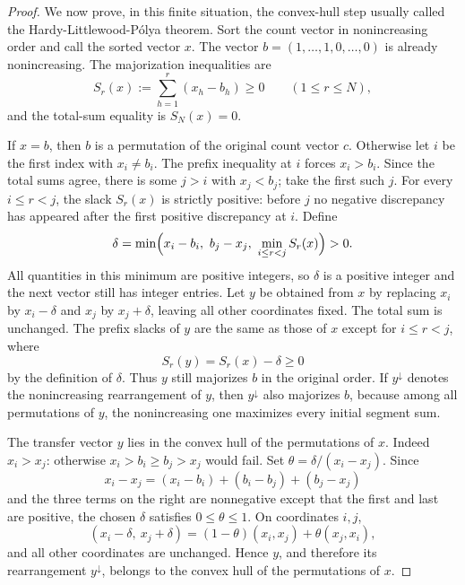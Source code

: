 \begin{proof}
We now prove, in this finite situation, the convex-hull step usually called
the Hardy-Littlewood-P\'olya theorem.  Sort the count vector in nonincreasing
order and call the sorted vector \(x\).  The vector \(b=(1,\ldots,1,0,\ldots,0)\)
is already nonincreasing.  The majorization inequalities are
\[
S_r(x):=\sum_{h=1}^r(x_h-b_h)\ge0\qquad(1\le r\le N),
\]
and the total-sum equality is \(S_N(x)=0\).

If \(x=b\), then \(b\) is a permutation of the original count vector \(c\).
Otherwise let \(i\) be the first index with \(x_i\ne b_i\).  The prefix
inequality at \(i\) forces \(x_i>b_i\).  Since the total sums agree, there is
some \(j>i\) with \(x_j<b_j\); take the first such \(j\).  For every
\(i\le r<j\), the slack \(S_r(x)\) is strictly positive: before \(j\) no
negative discrepancy has appeared after the first positive discrepancy at
\(i\).  Define
\[
\delta=\min\Bigl(x_i-b_i,\ b_j-x_j,\ \min_{i\le r<j}S_r(x)\Bigr)>0.
\]
All quantities in this minimum are positive integers, so \(\delta\) is a
positive integer and the next vector still has integer entries.
Let \(y\) be obtained from \(x\) by replacing \(x_i\) by \(x_i-\delta\) and
\(x_j\) by \(x_j+\delta\), leaving all other coordinates fixed.  The total
sum is unchanged.  The prefix slacks of \(y\) are the same as those of \(x\)
except for \(i\le r<j\), where
\[
S_r(y)=S_r(x)-\delta\ge0
\]
by the definition of \(\delta\).  Thus \(y\) still majorizes \(b\) in the
original order.  If \(y^\downarrow\) denotes the nonincreasing rearrangement
of \(y\), then \(y^\downarrow\) also majorizes \(b\), because among all
permutations of \(y\), the nonincreasing one maximizes every initial segment
sum.

The transfer vector \(y\) lies in the convex hull of the permutations of
\(x\).  Indeed \(x_i>x_j\): otherwise \(x_i>b_i\ge b_j>x_j\) would fail.
Set \(\theta=\delta/(x_i-x_j)\).  Since
\[
x_i-x_j=(x_i-b_i)+(b_i-b_j)+(b_j-x_j)
\]
and the three terms on the right are nonnegative except that the first and
last are positive, the chosen \(\delta\) satisfies \(0\le\theta\le1\).
On coordinates \(i,j\),
\[
(x_i-\delta,\ x_j+\delta)
=(1-\theta)(x_i,x_j)+\theta(x_j,x_i),
\]
and all other coordinates are unchanged.  Hence \(y\), and therefore its
rearrangement \(y^\downarrow\), belongs to the convex hull of the
permutations of \(x\).


\end{proof}
